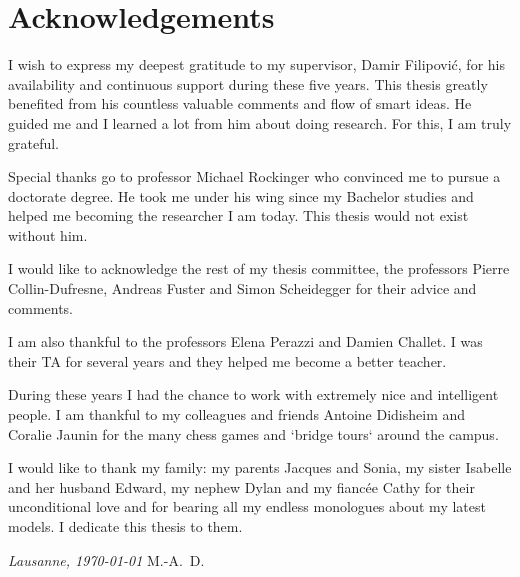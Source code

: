 \chapter*{Acknowledgements}

I wish to express my deepest gratitude to my supervisor, Damir Filipović, for his availability and continuous support during these five years. This thesis greatly benefited from his countless valuable comments and flow of smart ideas. He guided me and I learned a lot from him about doing research. For this, I am truly grateful.

Special thanks go to professor Michael Rockinger who convinced me to pursue a doctorate degree. He took me under his wing since my Bachelor studies and helped me becoming the researcher I am today. This thesis would not exist without him.

I would like to acknowledge the rest of my thesis committee, the professors Pierre Collin-Dufresne, Andreas Fuster and Simon Scheidegger for their advice and comments.

I am also thankful to the professors Elena Perazzi and Damien Challet. I was their TA for several years and they helped me become a better teacher.

During these years I had the chance to work with extremely nice and intelligent people. I am thankful to my colleagues and friends Antoine Didisheim and Coralie Jaunin for the many chess games and `bridge tours` around the campus.

I would like to thank my family: my parents Jacques and Sonia, my sister Isabelle and her husband Edward, my nephew Dylan and my fiancée Cathy for their unconditional love and for bearing all my endless monologues about my latest models. I dedicate this thesis to them.

\bigskip
 
\noindent\textit{Lausanne, \today}
\hfill M.-A.~D.
